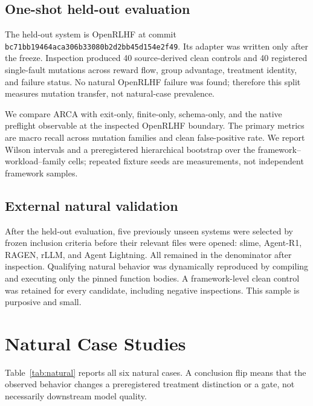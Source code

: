 \documentclass[10pt]{article}
\newcommand{\arca}{\textsc{ARCA}}
\newcommand{\code}[1]{\texttt{#1}}
\begin{document}
\subsection{One-shot held-out evaluation}

The held-out system is OpenRLHF at commit
\code{bc71bb19464aca306b33080b2d2bb45d154e2f49}.  Its adapter was written only
after the freeze.  Inspection produced 40 source-derived clean controls and 40
registered single-fault mutations across reward flow, group advantage,
treatment identity, and failure status.  No natural OpenRLHF failure was found;
therefore this split measures mutation transfer, not natural-case prevalence.

We compare \arca{} with exit-only, finite-only, schema-only, and the native
preflight observable at the inspected OpenRLHF boundary.  The primary metrics
are macro recall across mutation families and clean false-positive rate.  We
report Wilson intervals and a preregistered hierarchical bootstrap over the
framework--workload--family cells; repeated fixture seeds are measurements,
not independent framework samples.

\subsection{External natural validation}

After the held-out evaluation, five previously unseen systems were selected
by frozen inclusion criteria before their relevant files were opened: slime,
Agent-R1, RAGEN, rLLM, and Agent Lightning.  All remained in the denominator
after inspection.  Qualifying natural behavior was dynamically reproduced by
compiling and executing only the pinned function bodies.  A framework-level
clean control was retained for every candidate, including negative
inspections.  This sample is purposive and small.

\section{Natural Case Studies}

Table~\ref{tab:natural} reports all six natural cases.  A conclusion flip means
that the observed behavior changes a preregistered treatment distinction or a
gate, not necessarily downstream model quality.
\end{document}
